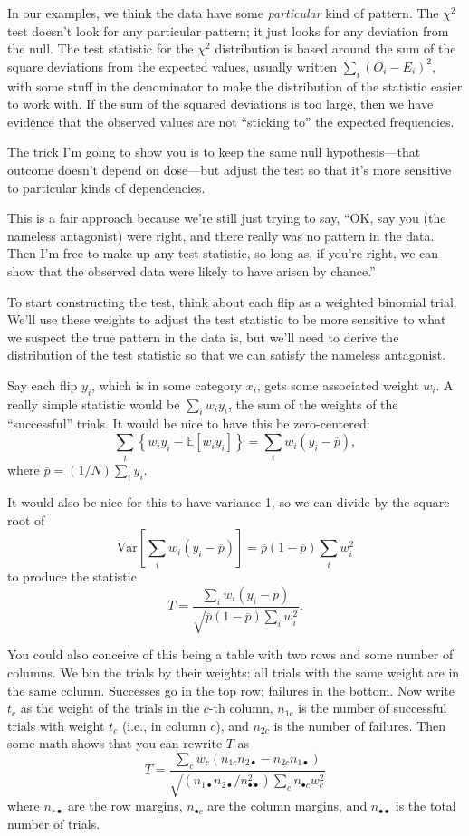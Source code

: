 In our examples, we think the data have some \emph{particular} kind of
pattern. The \(\chi^2\) test doesn't look for any particular pattern; it
just looks for any deviation from the null. The test statistic for the
\(\chi^2\) distribution is based around the sum of the square deviations
from the expected values, usually written \(\sum_i (O_i - E_i)^2\), with
some stuff in the denominator to make the distribution of the statistic
easier to work with. If the sum of the squared deviations is too large,
then we have evidence that the observed values are not ``sticking to''
the expected frequencies.

The trick I'm going to show you is to keep the same null
hypothesis---that outcome doesn't depend on dose---but adjust the test
so that it's more sensitive to particular kinds of dependencies.

This is a fair approach because we're still just trying to say, ``OK,
say you (the nameless antagonist) were right, and there really was no
pattern in the data. Then I'm free to make up any test statistic, so
long as, if you're right, we can show that the observed data were likely
to have arisen by chance.''

To start constructing the test, think about each flip as a weighted
binomial trial. We'll use these weights to adjust the test statistic to
be more sensitive to what we suspect the true pattern in the data is,
but we'll need to derive the distribution of the test statistic so that
we can satisfy the nameless antagonist.

Say each flip \(y_i\), which is in some category \(x_i\), gets some
associated weight \(w_i\). A really simple statistic would be
\(\sum_i w_i y_i\), the sum of the weights of the ``successful'' trials.
It would be nice to have this be zero-centered: \[
\sum_i \left\{ w_i y_i - \mathbb{E}\left[ w_i y_i \right] \right\} = \sum_i w_i (y_i - \overline{p}),
\] where \(\overline{p} = (1/N)\sum_i y_i\).

It would also be nice for this to have variance 1, so we can divide by
the square root of \[
\mathrm{Var}\left[ \sum_i w_i (y_i - \overline{p}) \right] = \overline{p} (1-\overline{p}) \sum_i w_i^2
\] to produce the statistic \[
T = \frac{\sum_i w_i (y_i - \overline{p})}{\sqrt{\overline{p} (1-\overline{p}) \sum_i w_i^2}}.
\]

You could also conceive of this being a table with two rows and some
number of columns. We bin the trials by their weights: all trials with
the same weight are in the same column. Successes go in the top row;
failures in the bottom. Now write \(t_c\) as the weight of the trials in
the \(c\)-th column, \(n_{1c}\) is the number of successful trials with
weight \(t_c\) (i.e., in column \(c\)), and \(n_{2c}\) is the number of
failures. Then some math shows that you can rewrite \(T\) as \[
T = \frac{\sum_c w_c (n_{1c} n_{2\bullet} - n_{2c} n_{1\bullet})}{\sqrt{(n_{1\bullet} n_{2\bullet} / n_{\bullet\bullet}^2) \sum_c n_{\bullet c} w_c^2}}
\] where \(n_{r\bullet}\) are the row margins, \(n_{\bullet c}\) are the
column margins, and \(n_{\bullet\bullet}\) is the total number of
trials.

